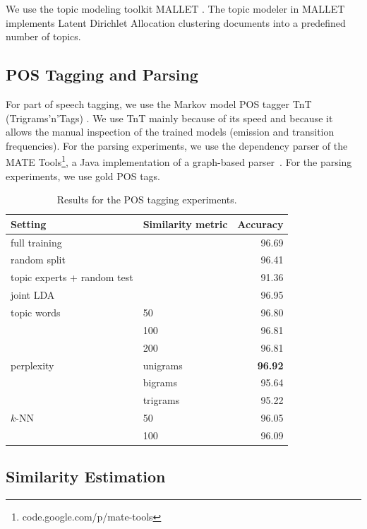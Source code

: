 We   use   the   topic   modeling   toolkit   MALLET  \cite{McCallumMALLET}.    The  topic  modeler  in MALLET implements Latent Dirichlet Allocation  clustering  documents  into  a  predefined number of topics.

\subsection{POS Tagging and Parsing}

For part of speech tagging, we use the Markov model POS tagger TnT (Trigrams'n'Tags) \cite{brants:00.2}. We use TnT mainly because of its speed and because it allows the manual inspection of the trained models (emission and transition
frequencies).
For the parsing experiments, we use the dependency parser of the MATE Tools\footnote{code.google.com/p/mate-tools}, a Java implementation of a graph-based parser~\cite{bohnet:2010:PAPERS}. For the parsing experiments, we use gold POS tags.



\begin{table}[!t]
\centering
\begin{tabular}{l|l|r|}
Setting & Similarity metric & Accuracy \\ \hline
full training &  & 96.69 \\ 
random split & & 96.41 \\ 
topic experts + random test &  & 91.36 \\ \hline
joint LDA &   & 96.95 \\ \hline
topic words & 50 & 96.80 \\ 
 & 100 & 96.81 \\ 
 & 200 & 96.81 \\ \hline
perplexity & unigrams & \textbf{96.92} \\ 
 & bigrams & 95.64 \\
 & trigrams & 95.22 \\ \hline
$k$-NN & 50 & 96.05 \\  
 & 100 & 96.09 \\ \hline
\end{tabular}

\caption{Results for the POS tagging experiments.}
\label{tab:overallresultspostag}
\end{table}



\subsection{Similarity Estimation}

